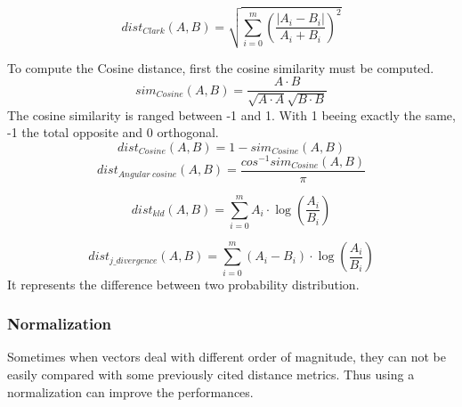 \begin{definition}
  \begin{equation}
    dist_{Clark}(A, B) = \sqrt{\sum_{i=0}^{m}\left(\frac{|A_i - B_i|}{A_i + B_i}\right)^2}
  \end{equation}
\end{definition}

\begin{definition}
  \label{def:cosine_dist}
  To compute the Cosine distance, first the cosine similarity must be computed.
  \begin{equation}
    sim_{Cosine}(A, B) = \frac{A \cdot B}{\sqrt{A \cdot A}\sqrt{B \cdot B}}
  \end{equation}
  The cosine similarity is ranged between -1 and 1.
  With 1 beeing exactly the same, -1 the total opposite and 0 orthogonal.
  \begin{equation}
    dist_{Cosine}(A, B) = 1 - sim_{Cosine}(A, B)
  \end{equation}
  \begin{equation}
    dist_{Angular\ cosine}(A, B) = \frac{cos^{-1}sim_{Cosine}(A, B)}{\pi}
  \end{equation}
\end{definition}

\begin{definition}
  \begin{equation}
    dist_{kld}(A, B) = \sum_{i=0}^{m} A_i \cdot \log(\frac{A_i}{B_i})
  \end{equation}
\end{definition}

\begin{definition}
  \begin{equation}
    dist_{j\_divergence}(A, B) = \sum_{i=0}^{m} (A_i - B_i) \cdot \log(\frac{A_i}{B_i})
  \end{equation}
  It represents the difference between two probability distribution.
\end{definition}


\subsubsection{Normalization}

Sometimes when vectors deal with different order of magnitude, they can not be easily compared with some previously cited distance metrics.
Thus using a normalization can improve the performances.

